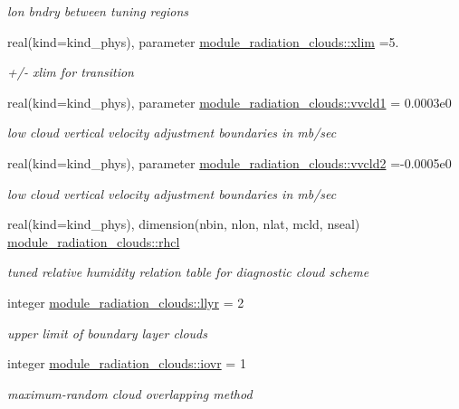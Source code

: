 \begin{DoxyCompactItemize}
\begin{DoxyCompactList}\small\item\em lon bndry between tuning regions \end{DoxyCompactList}\item 
real(kind=kind\+\_\+phys), parameter \hyperlink{group__module__radiation__clouds_ga1146f43b680b655d354a9c031ee4a463}{module\+\_\+radiation\+\_\+clouds\+::xlim} =5.
\begin{DoxyCompactList}\small\item\em +/-\/ xlim for transition \end{DoxyCompactList}\item 
real(kind=kind\+\_\+phys), parameter \hyperlink{group__module__radiation__clouds_ga6ec3c0444de53580befd4bb4d39844d3}{module\+\_\+radiation\+\_\+clouds\+::vvcld1} = 0.\+0003e0
\begin{DoxyCompactList}\small\item\em low cloud vertical velocity adjustment boundaries in mb/sec \end{DoxyCompactList}\item 
real(kind=kind\+\_\+phys), parameter \hyperlink{group__module__radiation__clouds_ga67962e77fb073cc25cafaaba0c2fa833}{module\+\_\+radiation\+\_\+clouds\+::vvcld2} =-\/0.\+0005e0
\begin{DoxyCompactList}\small\item\em low cloud vertical velocity adjustment boundaries in mb/sec \end{DoxyCompactList}\item 
real(kind=kind\+\_\+phys), dimension(nbin, nlon, nlat, mcld, nseal) \hyperlink{group__module__radiation__clouds_ga9673faf82ef00e0501763664743e3720}{module\+\_\+radiation\+\_\+clouds\+::rhcl}
\begin{DoxyCompactList}\small\item\em tuned relative humidity relation table for diagnostic cloud scheme \end{DoxyCompactList}\item 
integer \hyperlink{group__module__radiation__clouds_ga3390b20d42afccb3ec569a5b69a93f6e}{module\+\_\+radiation\+\_\+clouds\+::llyr} = 2
\begin{DoxyCompactList}\small\item\em upper limit of boundary layer clouds \end{DoxyCompactList}\item 
integer \hyperlink{group__module__radiation__clouds_ga5cfafee79e8cf066ddd8440cdfdc41a0}{module\+\_\+radiation\+\_\+clouds\+::iovr} = 1
\begin{DoxyCompactList}\small\item\em maximum-\/random cloud overlapping method \end{DoxyCompactList}\end{DoxyCompactItemize}
